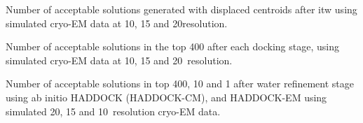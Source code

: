 \caption{}
{Number of acceptable solutions generated with displaced centroids after itw
using simulated cryo-EM data at 10, 15 and 20\Angstrom resolution.}
\stopbuffer


\stopbuffer



\caption{}
{Number of acceptable solutions in the top 400 after each docking stage, using
simulated cryo-EM data at 10, 15 and 20\Angstrom\ resolution.}
\stopbuffer


\stopbuffer



\caption{}
{Number of acceptable solutions in top 400, 10 and 1 after water refinement
stage using ab initio HADDOCK (HADDOCK-CM), and HADDOCK-EM using simulated 20,
15 and 10\Angstrom\ resolution cryo-EM data.} 
\stopbuffer


\stopbuffer
